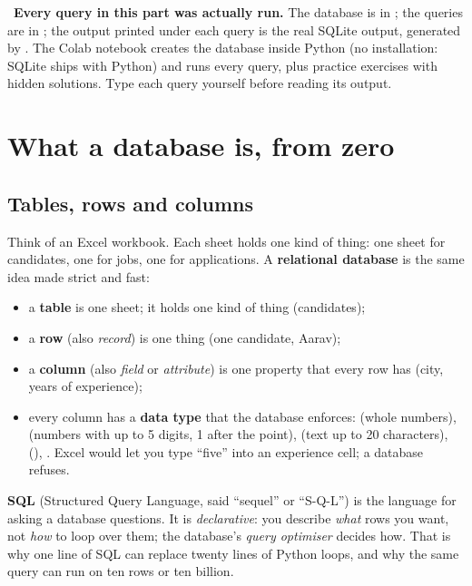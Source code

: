 \begin{tcolorbox}[colback=accentlight,colframe=accent,boxrule=0.5pt,arc=2pt]
\small\faLaptopCode\ \textbf{Every query in this part was actually run.} The database is in ;
the queries are in ; the output printed under each query is the real SQLite output, generated by .
The Colab notebook  creates the database inside Python (no installation: SQLite ships with Python) and runs every query, plus
practice exercises with hidden solutions. Type each query yourself before reading its output.
\end{tcolorbox}

\section{What a database is, from zero}
\subsection{Tables, rows and columns}
Think of an Excel workbook. Each sheet holds one kind of thing: one sheet for candidates, one for jobs, one for applications. A \textbf{relational
database} is the same idea made strict and fast:
\begin{itemize}
\item a \textbf{table} is one sheet; it holds one kind of thing (candidates);
\item a \textbf{row} (also \emph{record}) is one thing (one candidate, Aarav);
\item a \textbf{column} (also \emph{field} or \emph{attribute}) is one property that every row has (city, years of experience);
\item every column has a \textbf{data type} that the database enforces:  (whole numbers),  (numbers with up to 5 digits,
1 after the point),  (text up to 20 characters),  (), . Excel would let you type ``five''
into an experience cell; a database refuses.
\end{itemize}
\textbf{SQL} (Structured Query Language, said ``sequel'' or ``S-Q-L'') is the language for asking a database questions. It is \emph{declarative}: you
describe \emph{what} rows you want, not \emph{how} to loop over them; the database's \emph{query optimiser} decides how. That is why one line of SQL can
replace twenty lines of Python loops, and why the same query can run on ten rows or ten billion.

